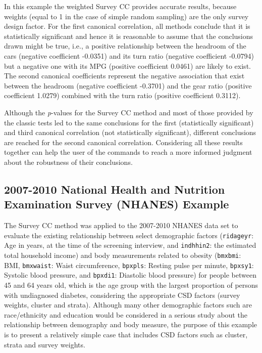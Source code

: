 In this example the weighted Survey CC provides accurate results, because weights (equal to 1 in the case of simple random sampling) are the only survey design factor. For the first canonical correlation, all methods conclude that it is statistically significant and hence it is reasonable to assume that the conclusions drawn might be true, i.e., a positive relationship between the headroom of the cars (negative coefficient -0.0351) and its turn ratio (negative coefficient -0.0794) but a negative one with its MPG (positive coefficient 0.0461) are likely to exist. The second canonical coefficients represent the negative association that exist between the headroom (negative coefficient -0.3701) and the gear ratio (positive coefficient 1.0279) combined with the turn ratio (positive coefficient 0.3112).

Although the \emph{p}-values for the Survey CC method and most of those provided by the classic tests led to the same conclusions for the first (statistically significant) and third canonical correlation (not statistically significant), different conclusions are reached for the second canonical correlation. Considering all these results together can help the user of the commands to reach a more informed judgment about the robustness of their conclusions.

\hypertarget{national-health-and-nutrition-examination-survey-nhanes-example}{%
\subsection{2007-2010 National Health and Nutrition Examination Survey (NHANES) Example}\label{national-health-and-nutrition-examination-survey-nhanes-example}}

The Survey CC method was applied to the 2007-2010 NHANES data set to evaluate the existing relationship between select demographic factors (\texttt{ridageyr}: Age in years, at the time of the screening interview, and \texttt{indhhin2}: the estimated total household income) and body measurements related to obesity (\texttt{bmxbmi}: BMI, \texttt{bmxwaist}: Waist circumference, \texttt{bpxpls}: Resting pulse per minute, \texttt{bpxsy1}: Systolic blood pressure, and \texttt{bpxdi1}: Diastolic blood pressure) for people between 45 and 64 years old, which is the age group with the largest proportion of persons with undiagnosed diabetes, considering the appropriate CSD factors (survey weights, cluster and strata). Although many other demographic factors such are race/ethnicity and education would be considered in a serious study about the relationship between demography and body measure, the purpose of this example is to present a relatively simple case that includes CSD factors such as cluster, strata and survey weights.

